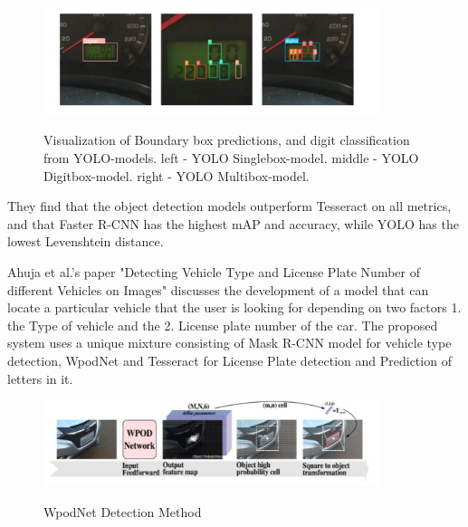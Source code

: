 \begin{figure}[ht]
    \centering
    \includegraphics[width=0.88\textwidth]{Figures/tesseract_papers/Andersson_2022.jpg}
    \caption[Visualization of Boundary box predictions, and digit classification from
        YOLO-models. left - YOLO Singlebox-model. middle - YOLO Digitbox-model. right - YOLO
        Multibox-model.]{Visualization of Boundary box predictions, and digit classification from
        YOLO-models. left - YOLO Singlebox-model. middle - YOLO Digitbox-model. right - YOLO
        Multibox-model.}\cite{anderssonBenchmarkingObjectDetection2022}
    \label{fig:Andersson Visualisation of Boundary box predictions}
\end{figure}


They find that the object detection models outperform Tesseract on all metrics, and that Faster R-CNN has the highest mAP and accuracy, while YOLO has the lowest Levenshtein distance. \cite{anderssonBenchmarkingObjectDetection2022}


Ahuja et al.'s paper "Detecting Vehicle Type and License Plate Number of different Vehicles on Images" discusses the development of a model that can locate a particular vehicle that the user is looking for depending on two factors 1. the Type of vehicle and the 2. License plate number of the car. The proposed system uses a unique mixture consisting of Mask R-CNN model for vehicle type detection, WpodNet and Tesseract for License Plate detection and Prediction of letters in it.
\cite{ahujaDetectingVehicleType}

\begin{figure}[ht]
    \centering
    \includegraphics[width=0.88\textwidth]{Figures/tesseract_papers/Ahuja_2021.jpg}
    \caption[WpodNet Detection Method]{WpodNet Detection Method}\cite{ahujaDetectingVehicleType}
    \label{fig:WpodNet Detection Method}
\end{figure}

